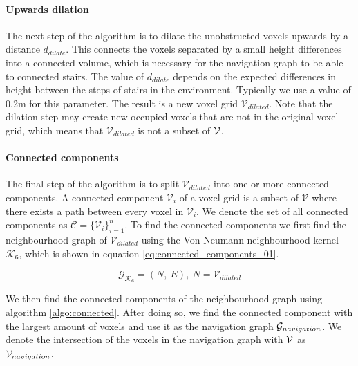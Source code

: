 \paragraph{Upwards dilation}
The next step of the algorithm is to dilate the unobstructed voxels upwards by a distance \(d_{dilate}\). This connects the voxels separated by a small height differences into a connected volume, which is necessary for the navigation graph to be able to connected stairs. The value of \(d_{dilate}\) depends on the expected differences in height between the steps of stairs in the environment. Typically we use a value of 0.2m for this parameter. The result is a new voxel grid \(\mathcal{V}_{dilated}\). Note that the dilation step may create new occupied voxels that are not in the original voxel grid, which means that \(\mathcal{V}_{dilated}\) is not a subset of \(\mathcal{V}\).

\paragraph{Connected components}
The final step of the algorithm is to split \(\mathcal{V}_{dilated}\) into one or more connected components. A connected component \(\mathcal{V}_i\) of a voxel grid is a subset of \(\mathcal{V}\) where there exists a path between every voxel in \(\mathcal{V}_i\). We denote the set of all connected components as \(\mathcal{C}=\{\mathcal{V}_{i}\}_{i=1}^n\). To find the connected components we first find the neighbourhood graph of \(\mathcal{V}_{dilated}\) using the Von Neumann neighbourhood kernel \(\mathcal{K}_6\), which is shown in equation \ref{eq:connected_components_01}. 

\begin{equation}
    \label{eq:connected_components_01}
    \mathcal{G}_{\mathcal{K}_6} = (N,\ E),\ N = \mathcal{V}_{dilated}
\end{equation}

We then find the connected components of the neighbourhood graph using algorithm \ref{algo:connected}. After doing so, we find the connected component with the largest amount of voxels and use it as the navigation graph \(\mathcal{G}_{navigation}\). We denote the intersection of the voxels in the navigation graph with \(\mathcal{V}\) as \(\mathcal{V}_{navigation}\).


